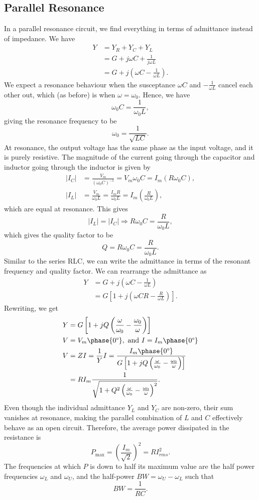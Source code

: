 \documentclass{article}
\begin{document}
\subsection{Parallel Resonance}
In a parallel resonance circuit, we find everything in terms of admittance instead of impedance. We have
\begin{align*}
    Y &= Y_R+Y_C+Y_L\\
      &= G+j\omega C+\frac{1}{j\omega L}\\
      &= G+j \left( \omega C-\frac{1}{\omega L} \right).
\end{align*}
We expect a resonance behaviour when the susceptance $\omega C$ and $-\frac{1}{\omega L}$ cancel each other out, which (as before) is when $\omega =\omega _0$. Hence, we have 
\[
    \omega _0C=\frac{1}{\omega _0L},
\]
giving the resonance frequency to be 
\[
    \omega _0=\frac{1}{\sqrt{LC}}.
\]
At resonance, the output voltage has the same phase as the input voltage, and it is purely resistive. The magnitude of the current going through the capacitor and inductor going through the inductor is given by
\begin{align*}
    \left| I_C \right| &= \frac{V_m}{\left( \omega _0C \right)^{-1}}=V_m\omega _0C=I_m \left( R\omega _0C \right),\\
    \left| I_L \right|&= \frac{V_m}{\omega _0L}=\frac{I_mR}{\omega _0L}=I_m \left(  \frac{R}{\omega _0L} \right),
\end{align*}
which are equal at resonance. This gives 
\[
    \left| I_L \right|=\left| I_C \right|\Rightarrow R\omega _0C=\frac{R}{\omega _0L},
\]
which gives the quality factor to be 
\[
    Q=R\omega _0C=\frac{R}{\omega _0L}.
\]
Similar to the series RLC, we can write the admittance in terms of the resonant frequency and quality factor. We can rearrange the admittance as
\begin{align*}
    Y &= G+j \left( \omega C-\frac{1}{\omega L} \right)\\
      &=G \left[ 1+j \left( \omega CR-\frac{R}{\omega L} \right) \right].
\end{align*}
Rewriting, we get
\begin{align*}
    Y &= G \left[ 1+jQ \left( \frac{\omega }{\omega _0}-\frac{\omega _0}{\omega } \right) \right]\\
    V&=V_m\phase{0\degree}, \text{ and } I=I_m\phase{0\degree}\\
    V&=ZI=\frac{1}{Y}I=\frac{I_m\phase{0\degree}}{G \left[ 1+jQ \left( \frac{\omega }{\omega _0}-\frac{\omega _0}{\omega } \right) \right]}\\
     &= RI_m \frac{1}{\sqrt{1+Q^2 \left( \frac{\omega }{\omega _0}-\frac{\omega _0}{\omega } \right)^2}}.
\end{align*}
Even though the individual admittance $Y_L$ and $Y_C$ are non-zero, their sum vanishes at resonance, making the parallel combination of $L$ and $C$ effectively behave as an open circuit. Therefore, the average power dissipated in the resistance is 
\[
    P_{\text{max}}=\left( \frac{I_m}{\sqrt{2}} \right)^2=RI_{rms}^2.
\]
The frequencies at which $P$ is down to half its maximum value are the half power frequencies $\omega _L$ and $\omega _U$, and the half-power $BW=\omega _U-\omega _L$ such that 
\[
    BW=\frac{1}{RC}.
\]
\end{document}
